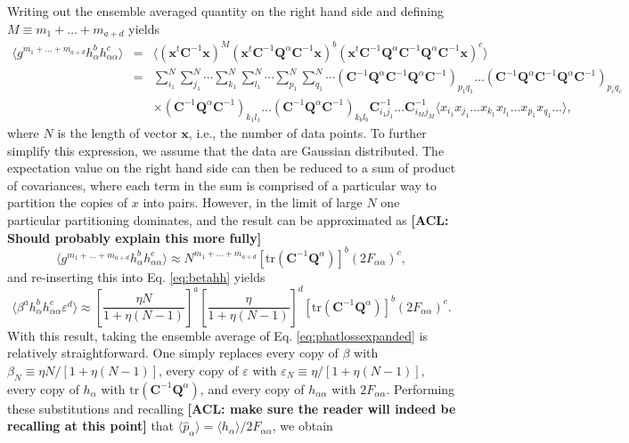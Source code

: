 \documentclass[preprint2,numberedappendix,tighten]{aastex6}  %
\newcommand{\x}{\mathbf{x}}
\newcommand{\C}{\mathbf{C}}
\newcommand{\Q}{\mathbf{Q}}
\newcommand{\acl}[1]{{\color{red} \textbf{[ACL:  #1]}}}
\begin{document}
Writing out the ensemble averaged quantity on the right hand side and defining $M \equiv m_1 + \dots + m_{a+d}$ yields
\begin{eqnarray}
\langle g^{m_1 + \dots + m_{a+d}} h_\alpha^b h_{\alpha \alpha}^c \rangle &=& \langle (\x^t \C^{-1} \x)^M (\x^t \C^{-1} \Q^\alpha \C^{-1} \x)^b (\x^t \C^{-1} \Q^\alpha \C^{-1} \Q^\alpha \C^{-1}\x )^c \rangle \nonumber \\
&=& \sum_{i_1}^N \sum_{j_1}^N \cdots  \sum_{k_1}^N \sum_{l_1}^N \cdots  \sum_{p_1}^N \sum_{q_1}^N \cdots  ( \C^{-1} \Q^\alpha \C^{-1} \Q^\alpha \C^{-1} )_{p_1 q_1} \dots (\C^{-1} \Q^\alpha \C^{-1} \Q^\alpha \C^{-1})_{p_c q_c}  \nonumber \\
&&  \times ( \C^{-1} \Q^\alpha \C^{-1})_{k_1 l_1} \dots ( \C^{-1} \Q^\alpha \C^{-1})_{k_b l_b} \C^{-1}_{i_1 j_1}\dots \C^{-1}_{i_M j_M} \langle x_{i_1} x_{j_1} \dots   x_{k_1} x_{l_1} \dots  x_{p_1} x_{q_1} \dots \rangle, \quad
\end{eqnarray}
where $N$ is the length of vector $\x$, i.e., the number of data points. To further simplify this expression, we assume that the data are Gaussian distributed. The expectation value on the right hand side can then be reduced to a sum of product of covariances, where each term in the sum is comprised of a particular way to partition the copies of $x$ into pairs. However, in the limit of large $N$ one particular partitioning dominates, and the result can be approximated as \acl{Should probably explain this more fully}
\begin{equation}
\langle g^{m_1 + \dots + m_{a+d}} h_\alpha^b h_{\alpha \alpha}^c \rangle \approx N^{m_1 + \dots + m_{a+d}} \left[ \textrm{tr} (\C^{-1} \Q^\alpha )\right]^b (2 F_{\alpha \alpha})^c,
\end{equation}
and re-inserting this into Eq. \eqref{eq:betahh} yields
\begin{equation}
\langle \beta^a h_\alpha^b h_{\alpha \alpha}^c \varepsilon^d \rangle \approx \left[ \frac{\eta N}{1+\eta (N-1)} \right]^a \left[ \frac{\eta }{1+\eta (N-1)} \right]^d \left[ \textrm{tr} (\C^{-1} \Q^\alpha )\right]^b (2 F_{\alpha \alpha})^c.
\end{equation}
With this result, taking the ensemble average of Eq. \eqref{eq:phatlossexpanded} is relatively straightforward. One simply replaces every copy of $\beta$ with $\beta_N \equiv \eta N / [1 + \eta (N-1)]$, every copy of $\varepsilon$ with $\varepsilon_N \equiv  \eta  / [1 + \eta (N-1)]$, every copy of $h_\alpha$ with $ \textrm{tr} (\C^{-1} \Q^\alpha )$, and every copy of $h_{\alpha \alpha}$ with $2F_{\alpha \alpha}$. Performing these substitutions and recalling \acl{make sure the reader will indeed be recalling at this point} that $\langle \hat{p}_\alpha \rangle = \langle h_\alpha \rangle / 2 F_{\alpha \alpha}$, we obtain
\end{document}
